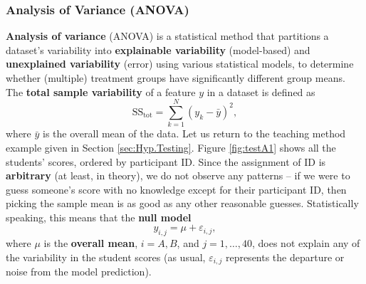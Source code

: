 
\subsubsection{Analysis of Variance (ANOVA)}\label{sec:ANOVA}
\textbf{Analysis of variance} (ANOVA) is a statistical method that partitions a dataset's variability into \textbf{explainable variability} (model-based) and \textbf{unexplained variability} (error) using various statistical models, to determine whether (multiple) treatment groups have significantly different group means. 
\newl The \textbf{total sample variability} of a feature $y$ in a dataset is defined as
\begin{equation*}
    \text{SS}_{\textrm{tot}}=\sum_{k=1}^{N}(y_{k}-\bar{y})^{2},
\end{equation*}
where $\bar{y}$ is the overall mean of the data. 
\newl Let us return to the teaching method example given in Section \ref{sec:Hyp.Testing}. Figure \ref{fig:testA1} shows all the students' scores, ordered by participant ID. Since the assignment of ID is \textbf{arbitrary} (at least, in theory), we do not observe any patterns -- if we were to guess someone's score with no knowledge except for their participant ID, then picking the sample mean is as good as any other reasonable guesses. \newl Statistically speaking, this means that the \textbf{null model}
\begin{equation*}
    y_{i,j}=\mu+\varepsilon_{i,j},
\end{equation*}
where $\mu$ is the \textbf{overall mean}, $i= {A,B}$, and $j=1,\ldots,40$, does not explain any of the variability in the student scores (as usual, $\varepsilon_{i,j}$ represents the departure or noise from the model prediction).

